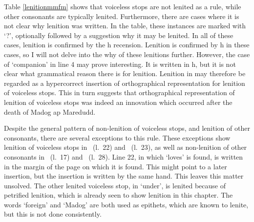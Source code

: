 Table \ref{lenitionmmfm} shows that voiceless stops are not lenited as a rule, while other consonants are typically lenited. Furthermore, there are cases where it is not clear why lenition was written. In the table, these instances are marked with `?', optionally followed by a suggestion why it may be lenited. In all of these cases, lenition is confirmed by the \gls{h} recension. Lenition is confirmed by \gls{h} in these cases, so I will not delve into the why of these lenitions further. However, the case of  `companion' in line 4 may prove interesting. It is written  in \gls{h}, but it is not clear what grammatical reason there is for lenition. Lenition in  may therefore be regarded as a hypercorrect insertion of orthographical representation for lenition of voiceless stops. This in turn suggests that orthographical representation of lenition of voiceless stops was indeed an innovation which occurred after the death of Madog ap Maredudd. 

Despite the general pattern of non-lenition of voiceless stops, and lenition of other consonants, there are several exceptions to this rule. These exceptions show lenition of voiceless stops in ~(l.~22) and ~(l.~23), as well as non-lenition of other consonants in ~(l.~17) and ~(l.~28). Line 22, in which  `loves' is found, is written in the margin of the page on which it is found. This might point to a later insertion, but the insertion is written by the same hand. This leaves this matter unsolved. The other lenited voiceless stop, in  `under', is lenited because of petrified lenition, which is already seen to show lenition in this chapter. The words  `foreign' and  `Madog' are both used as epithets, which are known to lenite, but this is not done consistently.

